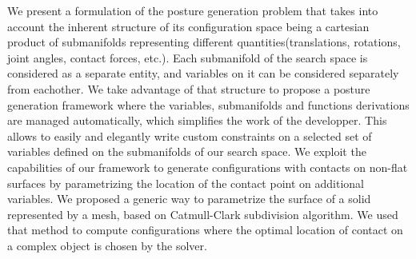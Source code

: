 We present a formulation of the posture generation problem that takes into account the inherent structure of its configuration space being a cartesian product of submanifolds representing different quantities(translations, rotations, joint angles, contact forces, etc.).
Each submanifold of the search space is considered as a separate entity, and variables on it can be considered separately from eachother.
We take advantage of that structure to propose a posture generation framework where the variables, submanifolds and functions derivations are managed automatically, which simplifies the work of the developper.
This allows to easily and elegantly write custom constraints on a selected set of variables defined on the submanifolds of our search space.
We exploit the capabilities of our framework to generate configurations with contacts on non-flat surfaces by parametrizing the location of the contact point on additional variables.
We proposed a generic way to parametrize the surface of a solid represented by a mesh, based on Catmull-Clark subdivision algorithm.
We used that method to compute configurations where the optimal location of contact on a complex object is chosen by the solver.





